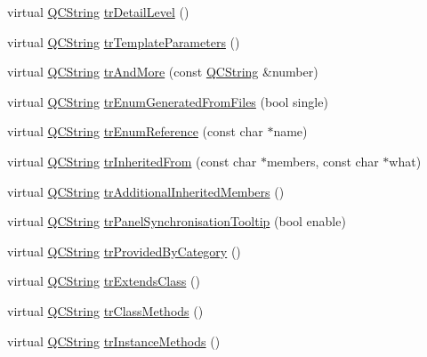 \begin{DoxyCompactItemize}
\item 
virtual \hyperlink{class_q_c_string}{Q\-C\-String} \hyperlink{class_translator_chinesetraditional_a138b581235bf64a0338ed25ee0d1ad61}{tr\-Detail\-Level} ()
\item 
virtual \hyperlink{class_q_c_string}{Q\-C\-String} \hyperlink{class_translator_chinesetraditional_ad9599164391093757c91bbe746f694a5}{tr\-Template\-Parameters} ()
\item 
virtual \hyperlink{class_q_c_string}{Q\-C\-String} \hyperlink{class_translator_chinesetraditional_a391327398836ee03f1d00415b80cb997}{tr\-And\-More} (const \hyperlink{class_q_c_string}{Q\-C\-String} \&number)
\item 
virtual \hyperlink{class_q_c_string}{Q\-C\-String} \hyperlink{class_translator_chinesetraditional_a2039b9a9624800366462f980e8ebce70}{tr\-Enum\-Generated\-From\-Files} (bool single)
\item 
virtual \hyperlink{class_q_c_string}{Q\-C\-String} \hyperlink{class_translator_chinesetraditional_a0209ef4cc7768fc9abf62f7ffc95534e}{tr\-Enum\-Reference} (const char $\ast$name)
\item 
virtual \hyperlink{class_q_c_string}{Q\-C\-String} \hyperlink{class_translator_chinesetraditional_af8b8b1bb56a7ea74b11dad76e644968e}{tr\-Inherited\-From} (const char $\ast$members, const char $\ast$what)
\item 
virtual \hyperlink{class_q_c_string}{Q\-C\-String} \hyperlink{class_translator_chinesetraditional_a62da1a83afa60109108fba6ad327a06f}{tr\-Additional\-Inherited\-Members} ()
\item 
virtual \hyperlink{class_q_c_string}{Q\-C\-String} \hyperlink{class_translator_chinesetraditional_a1800c322fe577f6dfab2ab8eb463a78e}{tr\-Panel\-Synchronisation\-Tooltip} (bool enable)
\item 
virtual \hyperlink{class_q_c_string}{Q\-C\-String} \hyperlink{class_translator_chinesetraditional_a48bb5cf8c4d20b9215921504ca43c8cf}{tr\-Provided\-By\-Category} ()
\item 
virtual \hyperlink{class_q_c_string}{Q\-C\-String} \hyperlink{class_translator_chinesetraditional_a943bb1d0d3cf3c3ddca3616c21f815da}{tr\-Extends\-Class} ()
\item 
virtual \hyperlink{class_q_c_string}{Q\-C\-String} \hyperlink{class_translator_chinesetraditional_a00e0dc60db9c989dad1bc310b4bdf08c}{tr\-Class\-Methods} ()
\item 
virtual \hyperlink{class_q_c_string}{Q\-C\-String} \hyperlink{class_translator_chinesetraditional_ac194051c0538db0a70504f6d11fbf9b7}{tr\-Instance\-Methods} ()

\end{DoxyCompactItemize}

